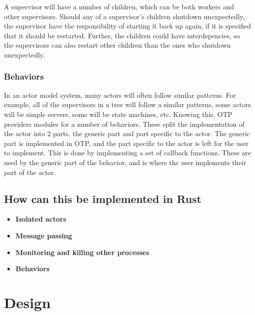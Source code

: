 \documentclass[a4paper]{article}
\begin{document}

A supervisor will have a number of children, which can be both workers and other
supervisors. Should any of a supervisor's children shutdown unexpectedly, the
supervisor have the responsibility of starting it back up again, if it is
specified that it should be restarted. Further, the children could have
interdepencies, so the supervisors can also restart other children than the ones
who shutdown unexpectedly.

\subsubsection{Behaviors}
In an actor model system, many actors will often follow similar patterns. For
example, all of the supervisors in a tree will follow a similar patterns, some
actors will be simple servers, some will be state machines, etc. Knowing this,
OTP providers modules for a number of behaviors. These split the implementation
of the actor into 2 parts, the generic part and part specific to the actor. The
generic part is implemented in OTP, and the part specific to the actor is left
for the user to implement. This is done by implementing a set of callback
functions. These are used by the generic part of the behavior, and is where the
user implements their part of the actor.

\subsection{How can this be implemented in Rust}
\begin{itemize}
\item \textbf{Isolated actors}
\item \textbf{Message passing}
\item \textbf{Monitoring and killing other processes}
\item \textbf{Behaviors}
\end{itemize}

\section{Design}
\end{document}
